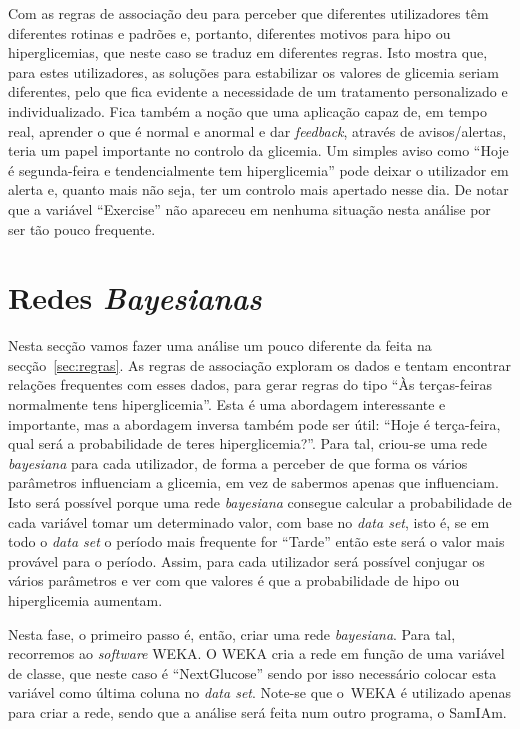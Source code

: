 Com as regras de associação deu para perceber que diferentes utilizadores têm diferentes rotinas e padrões e, portanto, diferentes motivos para hipo ou hiperglicemias, que neste caso se traduz em diferentes regras. Isto mostra que, para estes utilizadores, as soluções para estabilizar os valores de glicemia seriam diferentes, pelo que fica evidente a necessidade de um tratamento personalizado e individualizado. Fica também a noção que uma aplicação capaz de, em tempo real, aprender o que é normal e anormal e dar \textit{feedback}, através de avisos/alertas, teria um papel importante no controlo da glicemia. Um simples aviso como ``Hoje é segunda-feira e tendencialmente tem hiperglicemia'' pode deixar o utilizador em alerta e, quanto mais não seja, ter um controlo mais apertado nesse dia.
De notar que a variável ``Exercise'' não apareceu em nenhuma situação nesta análise por ser tão pouco frequente.

\section{Redes \textit{Bayesianas}}

Nesta secção vamos fazer uma análise um pouco diferente da feita na secção~\ref{sec:regras}. As regras de associação exploram os dados e tentam encontrar relações frequentes com esses dados, para gerar regras do tipo ``Às terças-feiras normalmente tens hiperglicemia''. Esta é uma abordagem interessante e importante, mas a abordagem inversa também pode ser útil: ``Hoje é terça-feira, qual será a probabilidade de teres hiperglicemia?''. Para tal, criou-se uma rede \textit{bayesiana} para cada utilizador, de forma a perceber de que forma os vários parâmetros influenciam a glicemia, em vez de sabermos apenas que influenciam. Isto será possível porque uma rede \textit{bayesiana} consegue calcular a probabilidade de cada variável tomar um determinado valor, com base no \textit{data set}, isto é, se em todo o \textit{data set} o período mais frequente for ``Tarde'' então este será o valor mais provável para o período. 
Assim, para cada utilizador será possível conjugar os vários parâmetros e ver com que valores é que a probabilidade de hipo ou hiperglicemia aumentam.

Nesta fase, o primeiro passo é, então, criar uma rede \textit{bayesiana}. Para tal, recorremos ao \textit{software} \ac{WEKA}. O \ac{WEKA} cria a rede em função de uma variável de classe, que neste caso é ``Next\textunderscore Glucose'' sendo por isso necessário colocar esta variável como última coluna no \textit{data set}. Note-se que o~\ac{WEKA} é utilizado apenas para criar a rede, sendo que a análise será feita num outro programa, o \ac{SamIAm}.

